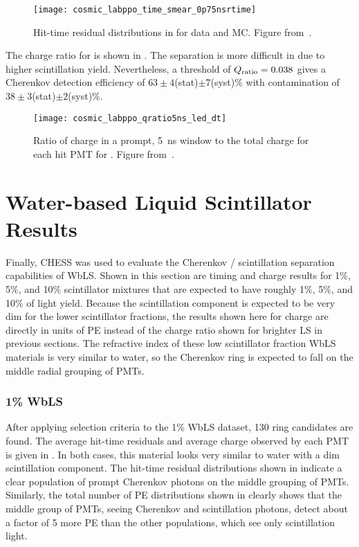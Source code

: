 \begin{figure}
	\centering
	\texttt{[image: cosmic\_labppo\_time\_smear\_0p75nsrtime]}
	\caption{Hit-time residual distributions in {\labppo} for data and MC. Figure from~\cite{chess_lab}.}
	\label{fig:labppo}
\end{figure}

The charge ratio for {\labppo} is shown in . 
The separation is more difficult in {\labppo} due to higher scintillation yield.  
Nevertheless, a threshold of $Q_{\rm ratio}=0.038$ gives a Cherenkov detection efficiency of $63\pm4$(stat)$\pm7$(syst)\% with contamination of $38\pm3$(stat)$\pm2$(syst)\%.

\begin{figure}
	\centering
	\texttt{[image: cosmic\_labppo\_qratio5ns\_led\_dt]}
	\caption{Ratio of charge in a prompt, 5~ns window to the total charge for each hit PMT for {\labppo}. Figure from~\cite{chess_lab}.}
	\label{f:labppoQ}
\end{figure}

\clearpage

\section{Water-based Liquid Scintillator Results}
\label{sec:wbls}

Finally, CHESS was used to evaluate the Cherenkov / scintillation separation capabilities of WbLS.
Shown in this section are timing and charge results for 1\%, 5\%, and 10\% scintillator mixtures that are expected to have roughly 1\%, 5\%, and 10\% of {\labppo} light yield.
Because the scintillation component is expected to be very dim for the lower scintillator fractions, the results shown here for charge are directly in units of PE instead of the charge ratio shown for brighter LS in previous sections.
The refractive index of these low scintillator fraction WbLS materials is very similar to water, so the Cherenkov ring is expected to fall on the middle radial grouping of PMTs.

\subsubsection{1\% WbLS}

After applying selection criteria to the 1\% WbLS dataset, 130 ring candidates are found.
The average hit-time residuals and average charge observed by each PMT is given in .
In both cases, this material looks very similar to water with a dim scintillation component.
The hit-time residual distributions shown in  indicate a clear population of prompt Cherenkov photons on the middle grouping of PMTs.
Similarly, the total number of PE distributions shown in  clearly shows that the middle group of PMTs, seeing Cherenkov and scintillation photons, detect about a factor of 5 more PE than the other populations, which see only scintillation light.

